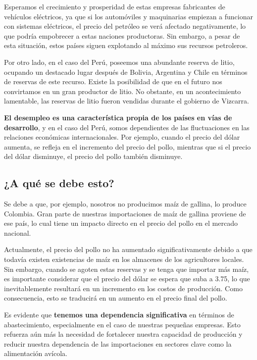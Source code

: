 \documentclass[
  jou,
  floatsintext,
  longtable,
  a4paper,
  nolmodern,
  notxfonts,
  notimes,
  12pt,
  colorlinks=true,linkcolor=blue,citecolor=blue,urlcolor=blue]{apa7}
\begin{document}
Esperamos el crecimiento y prosperidad de estas empresas fabricantes de
vehículos eléctricos, ya que si los automóviles y maquinarias empiezan a
funcionar con sistemas eléctricos, el precio del petróleo se verá
afectado negativamente, lo que podría empobrecer a estas naciones
productoras. Sin embargo, a pesar de esta situación, estos países siguen
explotando al máximo sus recursos petroleros.

Por otro lado, en el caso del Perú, poseemos una abundante reserva de
litio, ocupando un destacado lugar después de Bolivia, Argentina y Chile
en términos de reservas de este recurso. Existe la posibilidad de que en
el futuro nos convirtamos en un gran productor de litio. No obstante, en
un acontecimiento lamentable, las reservas de litio fueron vendidas
durante el gobierno de Vizcarra.

\textbf{El desempleo es una característica propia de los países en vías
de desarrollo}, y en el caso del Perú, somos dependientes de las
fluctuaciones en las relaciones económicas internacionales. Por ejemplo,
cuando el precio del dólar aumenta, se refleja en el incremento del
precio del pollo, mientras que si el precio del dólar disminuye, el
precio del pollo también disminuye.

\subsection{¿A qué se debe esto?}\label{a-quuxe9-se-debe-esto}

Se debe a que, por ejemplo, nosotros no producimos maíz de gallina, lo
produce Colombia. Gran parte de nuestras importaciones de maíz de
gallina proviene de ese país, lo cual tiene un impacto directo en el
precio del pollo en el mercado nacional.

Actualmente, el precio del pollo no ha aumentado significativamente
debido a que todavía existen existencias de maíz en los almacenes de los
agricultores locales. Sin embargo, cuando se agoten estas reservas y se
tenga que importar más maíz, es importante considerar que el precio del
dólar se espera que suba a 3.75, lo que inevitablemente resultará en un
incremento en los costos de producción. Como consecuencia, esto se
traducirá en un aumento en el precio final del pollo.

Es evidente que \textbf{tenemos una dependencia significativa} en
términos de abastecimiento, especialmente en el caso de nuestras
pequeñas empresas. Esto refuerza aún más la necesidad de fortalecer
nuestra capacidad de producción y reducir nuestra dependencia de las
importaciones en sectores clave como la alimentación avícola.
\end{document}
